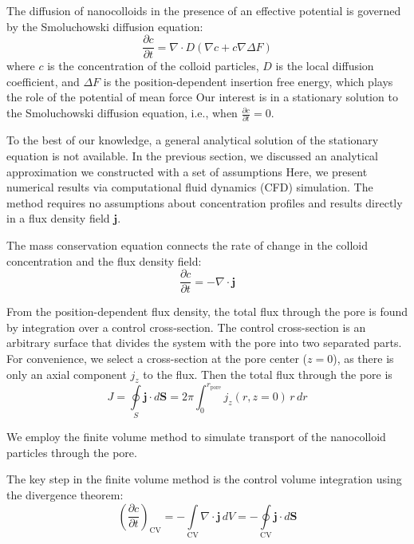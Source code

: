\documentclass[10pt, a4paper]{article}
\begin{document}
\begin{multicols}{2}
The diffusion of nanocolloids in the presence of an effective potential is governed by the Smoluchowski diffusion equation:
\begin{equation}
    \label{eq:Smoluchowski}
    \frac{\partial c}{\partial t} = \nabla \cdot D(\nabla c + c \nabla \Delta F)
\end{equation}
where $c$ is the concentration of the colloid particles, $D$ is the local diffusion coefficient, and $\Delta F$ is the position-dependent insertion free energy, which plays the role of the potential of mean force
Our interest is in a stationary solution to the Smoluchowski diffusion equation, i.e., when $\frac{\partial c}{\partial t} = 0$.

To the best of our knowledge, a general analytical solution of the stationary equation is not available.
In the previous section, we discussed an analytical approximation we constructed with a set of assumptions
Here, we present numerical results via computational fluid dynamics (CFD) simulation.
The method requires no assumptions about concentration profiles and results directly in a flux density field $\mathbf{j}$.

The mass conservation equation connects the rate of change in the colloid concentration and the flux density field:
\begin{equation}
    \frac{\partial c}{\partial t} = -\nabla \cdot \mathbf{j}
\end{equation}

From the position-dependent flux density, the total flux through the pore is found by integration over a control cross-section.
The control cross-section is an arbitrary surface that divides the system with the pore into two separated parts.
For convenience, we select a cross-section at the pore center ($z = 0$), as there is only an axial component $j_z$ to the flux.
Then the total flux through the pore is
\begin{equation}
    \label{eq:total_flux_1}
    J = \oint\limits_{S} \mathbf{j} \cdot d\mathbf{S} = 2 \pi \int_0^{r_\textrm{pore}} j_z(r, z = 0) \, r \, dr
\end{equation}

We employ the finite volume method to simulate transport of the nanocolloid particles through the pore.

The key step in the finite volume method is the control volume integration using the divergence theorem:
\begin{equation}
    \label{eq:CFD_integration_1}
    \left( \frac{\partial c}{\partial t} \right)_{\textrm{CV}} = -\int\limits_{\textrm{CV}} \nabla \cdot \mathbf{j} \, dV = -\oint\limits_{\textrm{CV}} \mathbf{j} \cdot d\mathbf{S}
\end{equation}


\end{multicols}
\end{document}
